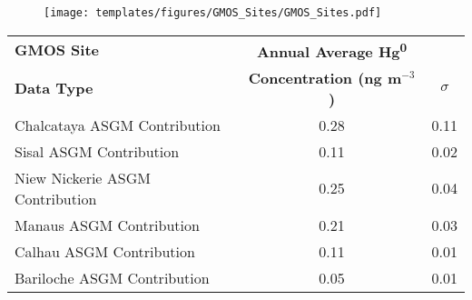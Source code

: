 



\begin{figure}[H]
\texttt{[image: templates/figures/GMOS\_Sites/GMOS\_Sites.pdf]}
\centering
{}
\label{fig:GMOSvsGC}
\end{figure}
\FloatBarrier

\begin{table}[H]
\label{tab:ASGM_at_GMOS_annual_avs}
\begin{tabular}{lSS}

\textbf{GMOS Site}  & \textbf{Annual Average Hg\textsuperscript{0}} &       \\
\textbf{Data Type}  & \textbf{Concentration (ng m$^{-3}$)}          &\textbf{$\sigma$} \\
                        
\hline
Chalcataya ASGM Contribution     &   0.28  & 0.11 \\
Sisal ASGM Contribution          &   0.11 &  0.02 \\
Niew Nickerie ASGM Contribution  &  0.25  & 0.04  \\
Manaus ASGM Contribution         &   0.21 &  0.03 \\
Calhau ASGM Contribution         &   0.11  & 0.01  \\
Bariloche ASGM Contribution      &   0.05 &  0.01  \\
\end{tabular}
\centering
\end{table}
